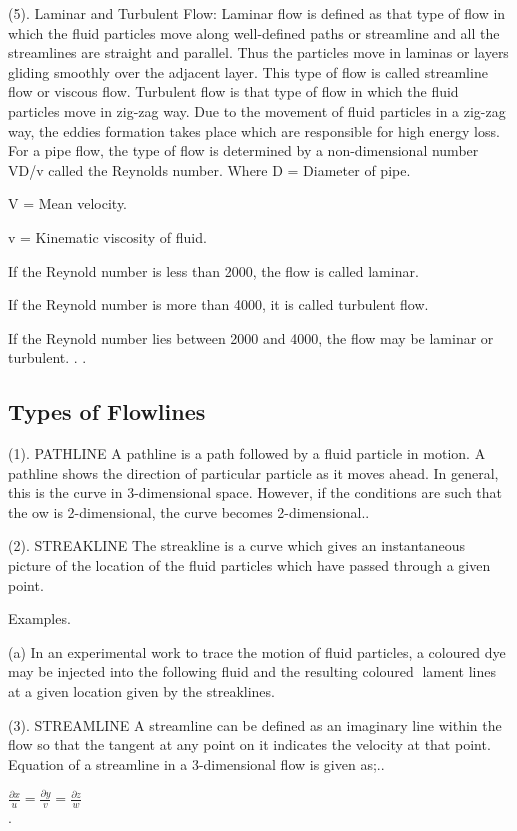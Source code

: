 \documentclass[a4paper, 12pt]{report}
\begin{document}
(5). 	Laminar and Turbulent Flow:
Laminar flow is defined as that type of flow in which the fluid particles
move along well-defined paths or streamline and all the streamlines
are straight and parallel. Thus the particles move in laminas or layers
gliding smoothly over the adjacent layer. This type of flow is called
streamline flow or viscous flow.
Turbulent flow is that type of flow in which the fluid particles move in
zig-zag way. Due to the movement of fluid particles in a zig-zag way, the eddies formation takes place which are responsible for high energy loss.
For a pipe flow, the type of flow is determined by a non-dimensional
number VD/v called the Reynolds number.
Where
D = Diameter of pipe.

V = Mean velocity.

v = Kinematic viscosity of fluid.


If the Reynold number is less than 2000, the flow is called laminar.


If the Reynold number is more than 4000, it is called turbulent flow.


If the Reynold number lies between 2000 and 4000, the flow may be laminar or turbulent.
.
.\subsection{Types of Flowlines}

(1). PATHLINE
A pathline is a path followed by a 
fluid particle in motion. A pathline
shows the direction of particular particle as it moves ahead. In general,
this is the curve in 3-dimensional space. However, if the conditions are
such that the 
ow is 2-dimensional, the curve becomes 2-dimensional..

(2). STREAKLINE
The streakline is a curve which gives an instantaneous picture of the
location of the fluid particles which have passed through a given point.

Examples.

(a) In an experimental work to trace the motion of fluid particles,
a coloured dye may be injected into the following 
fluid and the
resulting coloured lament lines at a given location given by the
streaklines.

(3). STREAMLINE
A streamline can be defined as an imaginary line within the flow so
that the tangent at any point on it indicates the velocity at that point.
Equation of a streamline in a 3-dimensional flow is given as;..


 $\displaystyle  \frac{\partial x}{u} =  \frac{\partial y}{v}= \frac{\partial z}{w}$\\.
\end{document}

